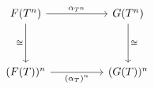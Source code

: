 \[\begin{tikzcd}
	{F(T^{n})} && {G(T^{n})} \\
	\\
	{(F(T))^{n}} && {(G(T))^{n}}
	\arrow["{\alpha_{T^{n}}}", from=1-1, to=1-3]
	\arrow["\iso"', from=1-1, to=3-1]
	\arrow["\iso", from=1-3, to=3-3]
	\arrow["{(\alpha_{T})^{n}}"', from=3-1, to=3-3]
\end{tikzcd}\]